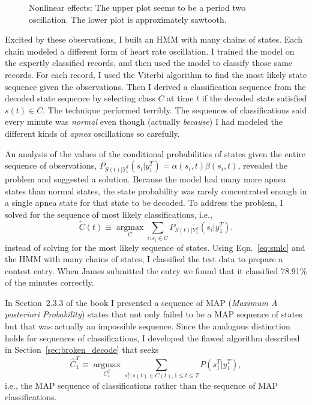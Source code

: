 \documentclass[]{article}
\newcommand{\ts}[3]{#1_{#2}^{#3}}                    %
\newcommand{\argmax}{\operatorname*{argmax}}
\newcommand{\ti}[2]{{#1}{(#2)}}                  %
\newcommand{\ie}{i.e.\xspace}
\newcommand{\plotsize}{%
  \fontsize{9}{9}%
  \selectfont}
\renewcommand{\comment}[1]{}
\newcommand{\IncludeApneaFig}[1]{\texttt{[image: ../../figs/apnea/\#1.pdf]}}
\begin{document}
\begin{figure}
  \centering{\plotsize%
    \def\aT{\emph{a12} HR}%
    \def\aZ{\emph{a01} HR}%
    \IncludeApneaFig{ApneaNLD}}
  \caption[\comment{fig:ApneaNLD }Nonlinear effects]%
  {Nonlinear effects: The upper plot seems to be a period two
    oscillation.  The lower plot is approximately sawtooth.}\label{fig:ApneaNLD}
\end{figure}

Excited by these observations, I built an HMM with many chains of
states.  Each chain modeled a different form of heart rate
oscillation.  I trained the model on the expertly classified records,
and then used the model to classify those same records.  For each
record, I used the Viterbi algorithm to find the most likely state
sequence given the observations.  Then I derived a classification
sequence from the decoded state sequence by selecting class $C$ at
time $t$ if the decoded state satisfied $\ti{s}{t}\in C$.  The
technique performed terribly.  The sequences of classifications said
every minute was \emph{normal} even though (actually \emph{because}) I had
modeled the different kinds of \emph{apnea} oscillations so carefully.

An analysis of the values of the conditional probabilities of states given
the entire sequence of observations, $P_{\ti{S}{t}|\ts{Y}{1}{T}}
\left(s_i|\ts{y}{1}{T} \right) = \alpha(s_i,t) \beta(s_i,t)$,
revealed the problem and suggested a solution.  Because the model had
many more apnea states than normal states, the state probability was
rarely concentrated enough in a single apnea state for that state to
be decoded.  To address the problem, I solved for the sequence of most
likely classifications, \ie,
\begin{equation}
  \label{eq:smlc}
  \ti{\tilde C}{t} \equiv \argmax_C \sum_{i:s_i\in C}
  P_{\ti{S}{t}|\ts{Y}{1}{T}} \left(s_i|\ts{y}{1}{T} \right).
\end{equation}
instead of solving for the most likely sequence of states.  Using
Eqn.~\eqref{eq:smlc} and the HMM with many chains of states, I
classified the test data to prepare a contest entry.  When James
submitted the entry %
we found that it classified 78.91\% of the minutes correctly.

In Section~2.3.3 of the book I presented a sequence of MAP
(\emph{Maximum A posteriori Probability}) states that not only failed
to be a MAP sequence of states but that was actually an impossible
sequence.  Since the analogous distinction holds for sequences of
classifications, I developed the flawed algorithm described in
Section~\ref{sec:broken_decode} that seeks
\begin{equation}
  \label{eq:mlsc}
  {\ts{\hat C}{1}{T}} \equiv \argmax_{\ts{C}{1}{T} }
  \sum_{\ts{s}{1}{T}:\ti{s}{t}\in \ti{C}{t}, 1 \leq t \leq T} P\left(
    \ts{s}{1}{T} | \ts{y}{1}{T} \right),
\end{equation}
\ie, the MAP sequence of classifications rather than the sequence of
MAP classifications.
\end{document}
